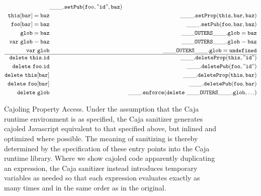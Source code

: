\documentclass[letterpaper,twocolumn,10pt]{article}
\newcommand{\code}[1]{{\tt {#1}}}              %
\begin{document}
\begin{figure}
\begin{eqnarray}
      & \code{\_\_\_.setPub(foo,"id",baz)} \\
  \code{this[bar] = baz}    & \label{set:index-internal}
      & \code{\_\_\_.setProp(this,bar,baz)} \\
  \code{foo[bar] = baz}     & \label{set:index-public}
      & \code{\_\_\_.setPub(foo,bar,baz)} \\
  \code{glob = baz}         & \label{set:global}
      & \code{\_\_\_OUTERS\_\_\_.glob = baz} \\
  \code{var\ glob = baz}    & \label{set:global-init}
      & \code{\_\_\_OUTERS\_\_\_.glob = baz} \\
  \code{var\ glob}          & \label{set:global-decl}
      & \code{\_\_\_OUTERS\_\_\_.glob = undefined} \\
  \hline
  \code{delete\ this.id}    & \label{delete-internal}
      & \code{\_\_\_.deleteProp(this,"id")} \\
  \code{delete\ foo.id}     & \label{delete:public}
      & \code{\_\_\_.deletePub(foo,"id")} \\
  \code{delete\ this[bar]}  & \label{delete:index-internal}
      & \code{\_\_\_.deleteProp(this,bar)} \\
 \code{delete\ foo[bar]}    & \label{delete:index-public}
      & \code{\_\_\_.deletePub(foo,bar)} \\
  \code{delete\ glob}       & \label{delete:global}
      & \code{\_\_\_.enforce(delete\ \_\_\_OUTERS\_\_\_.glob,\ldots)}
\end{eqnarray}

\caption[Cajoling Property Access]{Cajoling Property Access. Under the 
assumption that the Caja runtime environment is as specified, the Caja 
sanitizer generates cajoled Javascript equivalent to that specified above, 
but inlined and optimized where possible. The meaning of sanitizing is 
thereby determined by the specification of these entry points into the Caja 
runtime library. Where we show cajoled code apparently duplicating an 
expression, the Caja sanitizer instead introduces temporary variables as 
needed so that each expression evaluates exactly as many times and in the 
same order as in the original.}
\label{tab:prop-xlate}
\end{figure}
\end{document}
